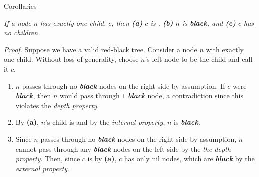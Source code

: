 \documentclass[aspectratio=169]{beamer}
\newcommand{\textib}[1]{\textit{\textbf{{#1}}}}
\newcommand{\red}{\textib{\color{red}{red }}}
\newcommand{\proposition}[1]{\begin{tcolorbox}[title={Proposition}]\small{\textit{{#1}}}\end{tcolorbox}}
\newcommand{\thm}[1]{\begin{tcolorbox}[title={Theorem}]\small{\textit{{#1}}}\end{tcolorbox}}
\begin{document}
\begin{frame}{Corollaries}
    \proposition{
        If a node $n$ has exactly one child, $c$, then 
        \textnormal{\textbf{(a)}} $c$ is \red,
        \textnormal{\textbf{(b)}} $n$ is \textib{black}, and
        \textnormal{\textbf{(c)}} $c$ has no children.
    }
    \textit{Proof.}
    Suppose we have a valid red-black tree. Consider a node $n$ with exactly one child. 
    Without loss of generality, choose $n$'s left node to be the child and call it $c$.
    \begin{enumerate}[label=\textbf{(\alph*)}]
        \item<2-> $n$ passes through no \textib{black} nodes on the right side by assumption. If $c$ were 
            \textib{black}, then $n$ would pass through $1$ \textib{black} node, a contradiction 
            since this violates the \textit{depth property}.
        \item<3-> By \textbf{(a)}, $n$'s child is \red and by the \textit{internal property}, $n$ is \textib{black}.
        \item <4-> Since $n$ passes through no \textib{black} nodes on the right side by assumption,
            $n$ cannot pass through any \textib{black} nodes on the left side by the \textit{the depth
            property}. Then, since $c$ is \red by \textbf{(a)}, $c$ has only nil nodes, which are 
            \textib{black} by the \textit{external property}.
    \end{enumerate}
\end{frame}

\end{document}
